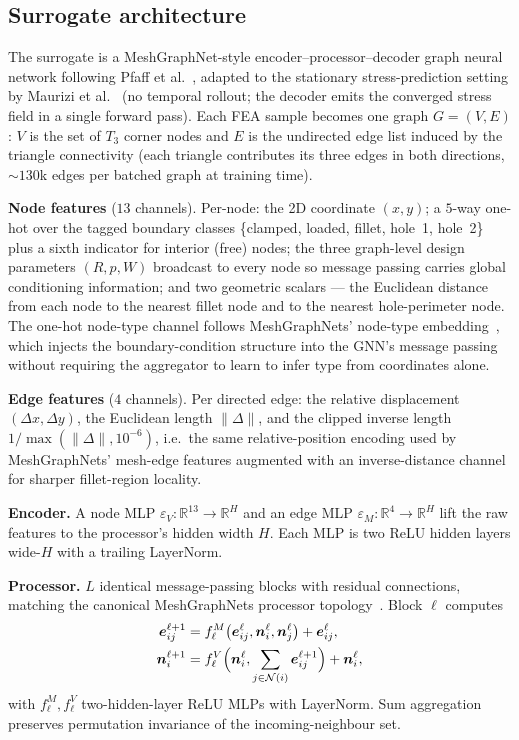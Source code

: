 \documentclass[11pt]{article}
\begin{document}
\subsection{Surrogate architecture}
\label{ssec:gnn}

The surrogate is a MeshGraphNet-style encoder--processor--decoder graph
neural network following Pfaff et al.~\cite{pfaff2021meshgraphnets}, adapted
to the stationary stress-prediction setting by Maurizi et
al.~\cite{maurizi2022gnn} (no temporal rollout; the decoder emits the
converged stress field in a single forward pass). Each FEA sample becomes
one graph $G = (V, E)$: $V$ is the set of $T_3$ corner nodes and $E$ is the
undirected edge list induced by the triangle connectivity (each triangle
contributes its three edges in both directions, $\sim 130$k edges per
batched graph at training time).

\textbf{Node features} ($13$ channels). Per-node: the 2D coordinate
$(x, y)$; a $5$-way one-hot over the tagged boundary classes
\{clamped, loaded, fillet, hole~1, hole~2\} plus a sixth indicator for
interior (free) nodes; the three graph-level design parameters
$(R, p, W)$ broadcast to every node so message passing carries global
conditioning information; and two geometric scalars --- the Euclidean
distance from each node to the nearest fillet node and to the nearest
hole-perimeter node. The one-hot node-type channel follows
MeshGraphNets' node-type
embedding~\cite{pfaff2021meshgraphnets}, which injects the boundary-condition
structure into the GNN's message passing without requiring the
aggregator to learn to infer type from coordinates alone.

\textbf{Edge features} ($4$ channels). Per directed edge: the relative
displacement $(\Delta x, \Delta y)$, the Euclidean length
$\lVert \Delta \rVert$, and the clipped inverse length
$1/\max(\lVert \Delta \rVert, 10^{-6})$, i.e.\ the same relative-position
encoding used by MeshGraphNets' mesh-edge features augmented with an
inverse-distance channel for sharper fillet-region locality.

\textbf{Encoder.} A node MLP $\varepsilon_V : \mathbb{R}^{13} \to
\mathbb{R}^H$ and an edge MLP $\varepsilon_M : \mathbb{R}^4 \to
\mathbb{R}^H$ lift the raw features to the processor's hidden width $H$.
Each MLP is two ReLU hidden layers wide-$H$ with a trailing LayerNorm.

\textbf{Processor.} $L$ identical message-passing blocks with residual
connections, matching the canonical MeshGraphNets processor
topology~\cite{pfaff2021meshgraphnets}. Block $\ell$ computes
\begin{align}
  \boldsymbol{e}_{ij}^{\ell+1}
  &= f^M_\ell\bigl(\boldsymbol{e}_{ij}^\ell,
                    \boldsymbol{n}_i^\ell,
                    \boldsymbol{n}_j^\ell\bigr)
   + \boldsymbol{e}_{ij}^\ell,
  \\
  \boldsymbol{n}_i^{\ell+1}
  &= f^V_\ell\Bigl(\boldsymbol{n}_i^\ell,
                    \sum_{j \in \mathcal{N}(i)}
                    \boldsymbol{e}_{ij}^{\ell+1}\Bigr)
   + \boldsymbol{n}_i^\ell,
\end{align}
with $f^M_\ell, f^V_\ell$ two-hidden-layer ReLU MLPs with LayerNorm. Sum
aggregation preserves permutation invariance of the incoming-neighbour
set.
\end{document}
